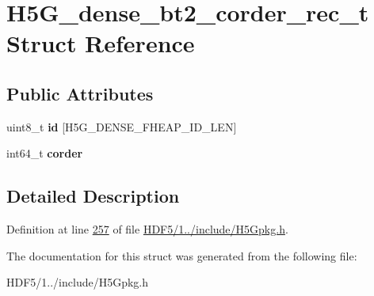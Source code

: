 \hypertarget{struct_h5_g__dense__bt2__corder__rec__t}{}\section{H5\+G\+\_\+dense\+\_\+bt2\+\_\+corder\+\_\+rec\+\_\+t Struct Reference}
\label{struct_h5_g__dense__bt2__corder__rec__t}
\subsection*{Public Attributes}
\begin{DoxyCompactItemize}
\item 
\mbox{\label{struct_h5_g__dense__bt2__corder__rec__t_a4a4ce5ce0669f942dc188dd6f26b8777}} 
uint8\+\_\+t {\bfseries id} \mbox{[}H5\+G\+\_\+\+D\+E\+N\+S\+E\+\_\+\+F\+H\+E\+A\+P\+\_\+\+I\+D\+\_\+\+L\+EN\mbox{]}
\item 
\mbox{\label{struct_h5_g__dense__bt2__corder__rec__t_ad1547f5999b9ffc6acbf7f5264f66582}} 
int64\+\_\+t {\bfseries corder}
\end{DoxyCompactItemize}


\subsection{Detailed Description}


Definition at line \hyperlink{_h_d_f5_21_810_81_2include_2_h5_gpkg_8h_source_l00257}{257} of file \hyperlink{_h_d_f5_21_810_81_2include_2_h5_gpkg_8h_source}{H\+D\+F5/1../include/\+H5\+Gpkg.\+h}.



The documentation for this struct was generated from the following file\+:\begin{DoxyCompactItemize}
\item 
H\+D\+F5/1../include/\+H5\+Gpkg.\+h\end{DoxyCompactItemize}
